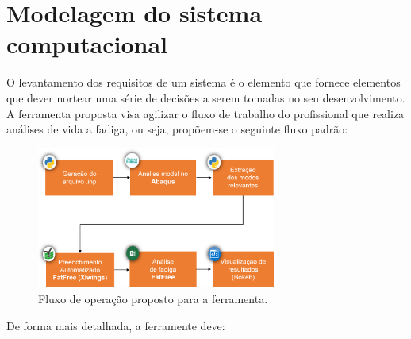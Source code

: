\chapter{Modelagem do sistema computacional}\label{chap:software}


O levantamento dos requisitos de um sistema é o elemento que fornece elementos que dever nortear uma série de decisões a serem tomadas no seu desenvolvimento. A ferramenta proposta visa agilizar o fluxo de trabalho do profissional que realiza análises de vida a fadiga, ou seja, propõem-se o seguinte fluxo padrão:

\begin{figure}[!ht]
    \centering
    \caption{Fluxo de operação proposto para a ferramenta.}\label{fig:workflow}
    \includegraphics[width=0.7\textwidth]{imagens/workflow}
\end{figure}

De forma mais detalhada, a ferramente deve:

